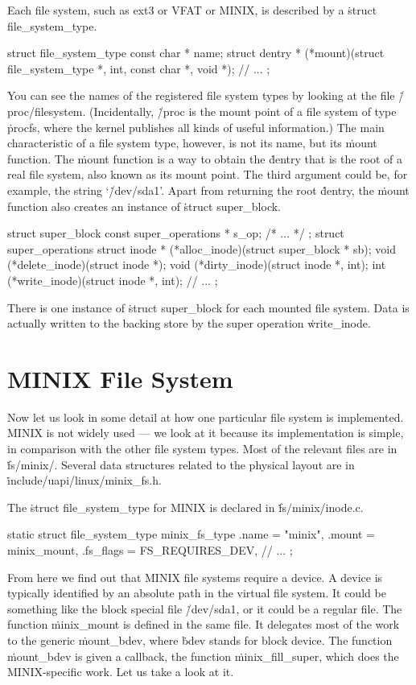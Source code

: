 Each file system, such as ext3 or VFAT or MINIX,
  is described by a \.{struct file\_system\_type}.
\begin{ccode}
struct file_system_type {
  const char * name;
  struct dentry * (*mount)(struct file_system_type *, int, const char *, void *);
  // ...
};
\end{ccode}
You can see the names of the registered file system types by looking
  at the file \.{/proc/filesystem}.
(Incidentally, \.{/proc} is the mount point of a file system of type \.{procfs},
  where the kernel publishes all kinds of useful information.)
The main characteristic of a file system type, however, is not its name,
  but its \.{mount} function.
The \.{mount} function is a way to obtain the \.{dentry}
  that is the root of a real file system,
  also known as its mount point.
The third argument could be, for example, the string `\.{/dev/sda1}'.
Apart from returning the root \.{dentry},
  the \.{mount} function also creates an instance of \.{struct super\_block}.
\begin{ccode}
struct super_block { const super_operations * s_op; /* ... */ };
struct super_operations {
  struct inode * (*alloc_inode)(struct super_block * sb);
  void (*delete_inode)(struct inode *);
  void (*dirty_inode)(struct inode *, int);
  int (*write_inode)(struct inode *, int);
  // ...
};
\end{ccode}
There is one instance of \.{struct super\_block} for each mounted file system.
Data is actually written to the backing store by the super operation
  \.{write\_inode}.


\section{MINIX File System}

Now let us look in some detail at how one particular file system is implemented.
MINIX is not widely used ---
  we look at it because its implementation is simple,
  in comparison with the other file system types.
Most of the relevant files are in \.{fs/minix/}.
Several data structures related to the physical layout are in
  \.{include/uapi/linux/minix\_fs.h}.

The \.{struct file\_system\_type} for MINIX is declared in \.{fs/minix/inode.c}.
\begin{ccode}
static struct file_system_type minix_fs_type {
  .name = "minix",
  .mount = minix_mount,
  .fs_flags = FS_REQUIRES_DEV,
  // ...
};
\end{ccode}
From here we find out that MINIX file systems require a device.
A device is typically identified by an absolute path in the virtual file system.
It could be something like the block special file \.{/dev/sda1},
  or it could be a regular file.
The function \.{minix\_mount} is defined in the same file.
It delegates most of the work to the generic \.{mount\_bdev},
  where \.{bdev} stands for block device.
The function \.{mount\_bdev} is given a callback,
  the function \.{minix\_fill\_super},
  which does the MINIX-specific work.
Let us take a look at it.

